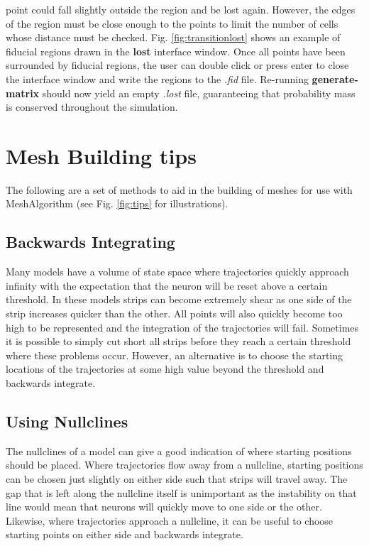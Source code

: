 \documentclass[utf8]{frontiers_suppmat} %
\begin{document}
point could fall slightly outside the region and be lost again. However, the edges of the region must be close enough to the points to limit the number of cells whose distance must be checked. Fig. \ref{fig:transitionlost} shows an example of fiducial regions drawn in the \textbf{lost} interface window. Once all points have been surrounded by fiducial regions, the user can double click or press enter to close the interface window and write the regions to the \textit{.fid} file. Re-running \textbf{generate-matrix} should now yield an empty \textit{.lost} file, guaranteeing that probability mass is conserved throughout the simulation.

\section{Mesh Building tips}
\label{meshtips}
The following are a set of methods to aid in the building of meshes for use with MeshAlgorithm (see Fig. \ref{fig:tips} for illustrations).\\
\subsection{Backwards Integrating}
Many models have a volume of state space where trajectories quickly approach infinity with the expectation that the neuron will be reset above a certain threshold. In these models strips can become extremely shear as one side of the strip increases quicker than the other. All points will also quickly become too high to be represented and the integration of the trajectories will fail. Sometimes it is possible to simply cut short all strips before they reach a certain threshold where these problems occur. However, an alternative is to choose the starting locations of the trajectories at some high value beyond the threshold and backwards integrate.\\

\subsection{Using Nullclines}
The nullclines of a model can give a good indication of where starting positions should be placed. Where trajectories flow away from a nullcline, starting positions can be chosen just slightly on either side such that strips will travel away. The gap that is left along the nullcline itself is unimportant as the instability on that line would mean that neurons will quickly move to one side or the other. Likewise, where trajectories approach a nullcline, it can be useful to choose starting points on either side and backwards integrate.\\
\end{document}
